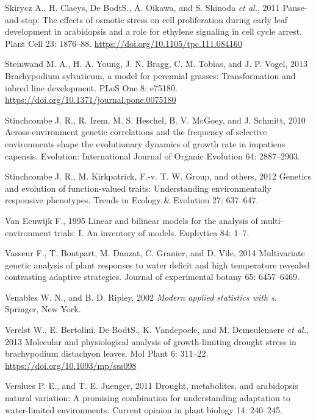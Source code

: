 \documentclass[jou,floatsintext]{apa6}
\begin{document}
\leavevmode\hypertarget{ref-skirycz2011pause}{}%
Skirycz A., H. Claeys, De BodtS., A. Oikawa, and S. Shinoda \emph{et al.}, 2011 Pause-and-stop: The effects of osmotic stress on cell proliferation during early leaf development in arabidopsis and a role for ethylene signaling in cell cycle arrest. Plant Cell 23: 1876--88. \url{https://doi.org/10.1105/tpc.111.084160}

\leavevmode\hypertarget{ref-steinwand2013sylvaticum}{}%
Steinwand M. A., H. A. Young, J. N. Bragg, C. M. Tobias, and J. P. Vogel, 2013 Brachypodium sylvaticum, a model for perennial grasses: Transformation and inbred line development. PLoS One 8: e75180. \url{https://doi.org/10.1371/journal.pone.0075180}

\leavevmode\hypertarget{ref-stinchcombe2010across}{}%
Stinchcombe J. R., R. Izem, M. S. Heschel, B. V. McGoey, and J. Schmitt, 2010 Across-environment genetic correlations and the frequency of selective environments shape the evolutionary dynamics of growth rate in impatiens capensis. Evolution: International Journal of Organic Evolution 64: 2887--2903.

\leavevmode\hypertarget{ref-stinchcombe2012genetics}{}%
Stinchcombe J. R., M. Kirkpatrick, F.-v. T. W. Group, and others, 2012 Genetics and evolution of function-valued traits: Understanding environmentally responsive phenotypes. Trends in Ecology \& Evolution 27: 637--647.

\leavevmode\hypertarget{ref-van1995linear}{}%
Van Eeuwijk F., 1995 Linear and bilinear models for the analysis of multi-environment trials: I. An inventory of models. Euphytica 84: 1--7.

\leavevmode\hypertarget{ref-vasseur2014multivariate}{}%
Vasseur F., T. Bontpart, M. Dauzat, C. Granier, and D. Vile, 2014 Multivariate genetic analysis of plant responses to water deficit and high temperature revealed contrasting adaptive strategies. Journal of experimental botany 65: 6457--6469.

\leavevmode\hypertarget{ref-MASS}{}%
Venables W. N., and B. D. Ripley, 2002 \emph{Modern applied statistics with s}. Springer, New York.

\leavevmode\hypertarget{ref-verelst2013molecular}{}%
Verelst W., E. Bertolini, De BodtS., K. Vandepoele, and M. Demeulenaere \emph{et al.}, 2013 Molecular and physiological analysis of growth-limiting drought stress in brachypodium distachyon leaves. Mol Plant 6: 311--22. \url{https://doi.org/10.1093/mp/sss098}

\leavevmode\hypertarget{ref-verslues2011drought}{}%
Verslues P. E., and T. E. Juenger, 2011 Drought, metabolites, and arabidopsis natural variation: A promising combination for understanding adaptation to water-limited environments. Current opinion in plant biology 14: 240--245.
\end{document}
